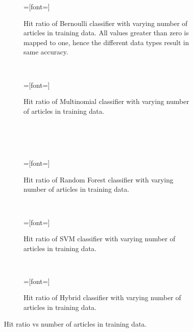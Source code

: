 \setlength{}
\setlength{}
\begin{figure}[H]
	\centering
	\begin{subfigure}[b]{\figwidth}
		=[font=\scriptsize]
		
		\caption{Hit ratio of Bernoulli classifier with varying number of articles in training data. All values greater than zero is mapped to one, hence the different data types result in same accuracy.}
		\label{fig:hitratio-data-nb}
	\end{subfigure}
	~
	\begin{subfigure}[b]{\figwidth}
		=[font=\scriptsize]
		
		\caption{Hit ratio of Multinomial classifier with varying number of articles in training data.\\\ \\\ }
		\label{fig:hitratio-data-mn}
	\end{subfigure}
	\\
	\begin{subfigure}[b]{\figwidth}
		=[font=\scriptsize]
		
		\caption{Hit ratio of Random Forest classifier with varying number of articles in training data.}
		\label{fig:hitratio-data-rf}
	\end{subfigure}
	~
	\begin{subfigure}[b]{\figwidth}
		=[font=\scriptsize]
		
		\caption{Hit ratio of SVM classifier with varying number of articles in training data.}
		\label{fig:hitratio-data-svm}
	\end{subfigure}
	\\
	\begin{subfigure}[b]{\figwidth}
		=[font=\scriptsize]
		
		\caption{Hit ratio of Hybrid classifier with varying number of articles in training data.}
		\label{fig:hitratio-data-hybrid}
	\end{subfigure}
	\caption{Hit ratio vs number of articles in training data.}
	\label{fig:hitratio-data}
\end{figure}